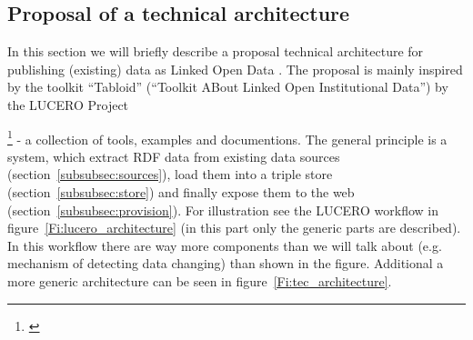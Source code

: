 \subsection{Proposal of a technical architecture}
In this section we will briefly describe a proposal technical architecture for publishing (existing) data as Linked Open Data
. The proposal is mainly inspired by the toolkit "`Tabloid"' ("`Toolkit ABout Linked Open Institutional Data"') by the LUCERO Project~{\footnote{\citet{url:lucero-tabloid}} - a collection of tools, examples and documentions. The general principle is a system, which extract RDF data from existing data sources (section~\ref{subsubsec:sources}), load them into a triple store (section~\ref{subsubsec:store}) and finally expose them to the web (section~\ref{subsubsec:provision}). For illustration see the LUCERO workflow in figure~\ref{Fi:lucero_architecture} (in this part only the generic parts are described). In this workflow there are way more components than we will talk about (e.g. mechanism of detecting data changing) than shown in the figure. Additional a more generic architecture can be seen in figure~\ref{Fi:tec_architecture}.

}
